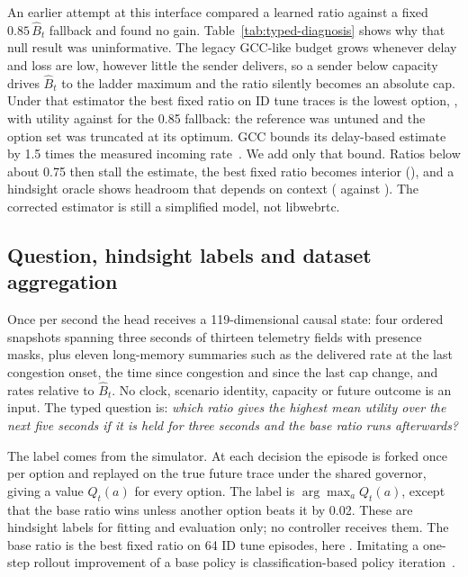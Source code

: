 \documentclass[10pt]{article}
\begin{document}
An earlier attempt at this interface compared a learned ratio against a fixed $0.85\,\hat B_t$ fallback and found no gain. Table~\ref{tab:typed-diagnosis} shows why that null result was uninformative. The legacy GCC-like budget grows whenever delay and loss are low, however little the sender delivers, so a sender below capacity drives $\hat B_t$ to the ladder maximum and the ratio silently becomes an absolute cap. Under that estimator the best fixed ratio on ID tune traces is the lowest option, \TypedDiagLegacyBest{}, with utility \TypedDiagLegacyBestUtility{} against \TypedDiagLegacyFallbackUtility{} for the 0.85 fallback: the reference was untuned and the option set was truncated at its optimum. GCC bounds its delay-based estimate by 1.5 times the measured incoming rate~\cite{holmer2016gcc}. We add only that bound. Ratios below about 0.75 then stall the estimate, the best fixed ratio becomes interior (\TypedDiagAckedBest{}), and a hindsight oracle shows headroom that depends on context (\TypedDiagAckedOracleUtility{} against \TypedDiagAckedBestUtility{}). The corrected estimator is still a simplified model, not libwebrtc.

\begin{table}[t]
\centering\small

\caption{Mean utility on the 64 ID tune episodes under the legacy unbounded estimator and the acked-rate-bounded estimator used in this study. The oracle re-plans every second with the true future trace and is a non-causal bound.}\label{tab:typed-diagnosis}
\end{table}

\subsection{Question, hindsight labels and dataset aggregation}
Once per second the head receives a 119-dimensional causal state: four ordered snapshots spanning three seconds of thirteen telemetry fields with presence masks, plus eleven long-memory summaries such as the delivered rate at the last congestion onset, the time since congestion and since the last cap change, and rates relative to $\hat B_t$. No clock, scenario identity, capacity or future outcome is an input. The typed question is: \emph{which ratio gives the highest mean utility over the next five seconds if it is held for three seconds and the base ratio runs afterwards?}

The label comes from the simulator. At each decision the episode is forked once per option and replayed on the true future trace under the shared governor, giving a value $Q_t(a)$ for every option. The label is $\arg\max_a Q_t(a)$, except that the base ratio wins unless another option beats it by 0.02. These are hindsight labels for fitting and evaluation only; no controller receives them. The base ratio is the best fixed ratio on 64 ID tune episodes, here \TypedBaseRatio{}. Imitating a one-step rollout improvement of a base policy is classification-based policy iteration~\cite{lagoudakis2003classification}.
\end{document}
